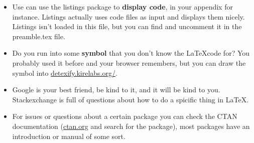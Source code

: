 \documentclass[thesis]{subfiles}
\begin{document}
\begin{itemize}
\item Use can use the listings package to \textbf{display code}, in your appendix for instance. Listings actually uses code files as input and displays them nicely. Listings isn't loaded in this file, but you can find and uncomment it in the preamble.tex file.

\item Do you run into some \textbf{symbol} that you don't know the \LaTeX code for? You probably used it before and your browser remembers, but you can draw the symbol into \url{detexify.kirelabs.org/}.

\item Google is your best friend, be kind to it, and it will be kind to you. Stackexchange is full of questions about how to do a spicific thing in \LaTeX.

\item For issues or questions about a certain package you can check the CTAN documentation (\url{ctan.org} and search for the package), most packages have an introduction or manual of some sort.
\end{itemize}
\end{document}
